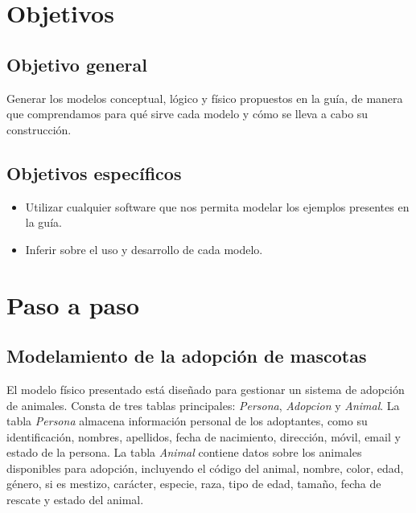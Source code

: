 \documentclass[12pt]{article}
\begin{document}
        \newpage
        \section{Objetivos}
                \subsection{Objetivo general}
                        Generar los modelos conceptual, lógico y físico propuestos en la guía, de manera que comprendamos para qué sirve cada modelo y cómo se lleva a cabo su construcción.
                
                \subsection{Objetivos específicos}
                        \begin{itemize}
                                \item Utilizar cualquier software que nos permita modelar los ejemplos presentes en la guía.
                                \item Inferir sobre el uso y desarrollo de cada modelo.
                        \end{itemize}


        \newpage
        \section{Paso a paso}
                \subsection{Modelamiento de la adopción de mascotas}
                        El modelo físico presentado está diseñado para gestionar un sistema de adopción de animales. Consta de tres tablas principales: \textit{Persona}, \textit{Adopcion} y \textit{Animal}. La tabla \textit{Persona} almacena información personal de los adoptantes, como su identificación, nombres, apellidos, fecha de nacimiento, dirección, móvil, email y estado de la persona. La tabla \textit{Animal} contiene datos sobre los animales disponibles para adopción, incluyendo el código del animal, nombre, color, edad, género, si es mestizo, carácter, especie, raza, tipo de edad, tamaño, fecha de rescate y estado del animal. 
                        
\end{document}
